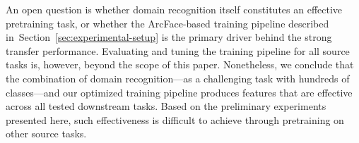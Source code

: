\documentclass[lettersize,journal,twoside,article]{IEEEtran}
\newcommand{\secref}[1]{Section~\ref{#1}}
\begin{document}
An open question is whether domain recognition itself constitutes an effective pretraining task, or whether the ArcFace-based training pipeline described in~\secref{sec:experimental-setup} is the primary driver behind the strong transfer performance. Evaluating and tuning the training pipeline for all source tasks is, however, beyond the scope of this paper. Nonetheless, we conclude that the combination of domain recognition---as a challenging task with hundreds of classes---and our optimized training pipeline produces features that are effective across all tested downstream tasks. Based on the preliminary experiments presented here, such effectiveness is difficult to achieve through pretraining on other source tasks.
\end{document}
